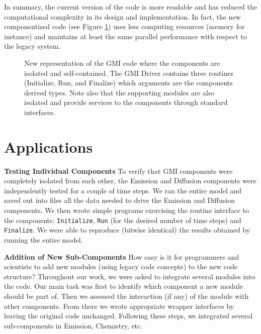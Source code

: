 \documentclass[11pt]{article}
\begin{document}
In summary, the current version of the code is more readable and has reduced the
computational complexity in its design and implementation.
In fact, the new componentized code (see Figure \ref{fig:newComp}) 
uses less computing resources 
(memory for instance) and maintains at least the same parallel performance 
with respect to the legacy system.

\begin{figure}
\centerline{}
\caption{New representation of the GMI code where the components are isolated
and self-contained. The GMI Driver contains three routines (Initialize, Run,
and Finalize) which arguments are the components derived types. Note also
that the supporting modules are also isolated and provide services to the
components through standard interfaces.}
\label{fig:newComp}
\end{figure}

\section{Applications} \label{sec:apps}
%

\noindent
{\bf Testing Individual Components} \newline
To verify that GMI components were completely isolated from each other,
the Emission and Diffusion components were independently tested
for a couple of time steps.
We ran the entire model and saved out into files all the data
needed to drive the Emission and Diffusion components.
We then wrote simple programs exercising the routine interface to the 
components: {\tt Initialize}, {\tt Run} (for the desired number of time steps) 
and {\tt Finalize}.
We were able to reproduce (bitwise identical) the results obtained by running 
the entire model.

\vskip 0.60cm

\noindent
{\bf Addition of New Sub-Components} \newline
How easy is it for programmers and scientists to add new modules 
(using legacy code concepts) to the new code structure?
Throughout our work, we were asked to integrate several modules into the code.
Our main task was first to identify which component a new module should be part of.
Then we assessed the interaction (if any) of the module with other components.
From there we wrote appropriate wrapper interfaces by leaving the original code
unchanged.
Following these steps, we integrated several sub-components in Emission, Chemistry,
etc.
\end{document}
